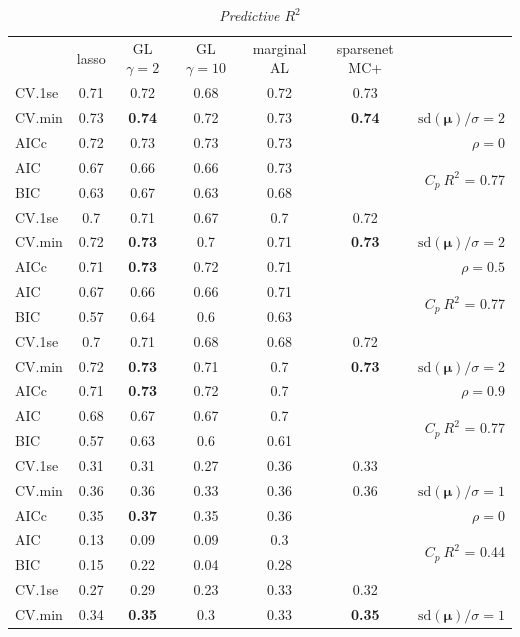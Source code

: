 \documentclass[12pt]{article}
\newcommand{\mr}[1]{\mathrm{#1}}
\newcommand{\bm}[1]{\mathbf{#1}}
\begin{document}
\begin{table}[p]\vspace{-.5cm}
\caption[l]{\it Predictive $R^2$\hfill}
\vspace{-.5cm}
\small{}
\begin{center}
\begin{tabular}{l*{5}{c}|r}
 & lasso & GL $\gamma=2$ & GL $\gamma=10$ & marginal AL & sparsenet MC+  &  \\
\cline{1-7}
CV.1se & 0.71 & 0.72 & 0.68 & 0.72 & 0.73 &\\
CV.min & 0.73 & {\bf 0.74} & 0.72 & 0.73 & {\bf 0.74} &  $\mr{sd}(\bm{\mu})/\sigma=2$ \\
AICc & 0.72 & 0.73 & 0.73 & 0.73 & & $\rho=0$ \\
AIC & 0.67 & 0.66 & 0.66 & 0.73 & & \multirow{2}{*}{$C_p ~ R^2$ = 0.77} \\
BIC & 0.63 & 0.67 & 0.63 & 0.68 & & \\
 \hline 
CV.1se & 0.7 & 0.71 & 0.67 & 0.7 & 0.72 &\\
CV.min & 0.72 & {\bf 0.73} & 0.7 & 0.71 & {\bf 0.73} &  $\mr{sd}(\bm{\mu})/\sigma=2$ \\
AICc & 0.71 & {\bf 0.73} & 0.72 & 0.71 & & $\rho=0.5$ \\
AIC & 0.67 & 0.66 & 0.66 & 0.71 & & \multirow{2}{*}{$C_p ~ R^2$ = 0.77} \\
BIC & 0.57 & 0.64 & 0.6 & 0.63 & & \\
 \hline 
CV.1se & 0.7 & 0.71 & 0.68 & 0.68 & 0.72 &\\
CV.min & 0.72 & {\bf 0.73} & 0.71 & 0.7 & {\bf 0.73} &  $\mr{sd}(\bm{\mu})/\sigma=2$ \\
AICc & 0.71 & {\bf 0.73} & 0.72 & 0.7 & & $\rho=0.9$ \\
AIC & 0.68 & 0.67 & 0.67 & 0.7 & & \multirow{2}{*}{$C_p ~ R^2$ = 0.77} \\
BIC & 0.57 & 0.63 & 0.6 & 0.61 & & \\
 \hline 
CV.1se & 0.31 & 0.31 & 0.27 & 0.36 & 0.33 &\\
CV.min & 0.36 & 0.36 & 0.33 & 0.36 & 0.36 &  $\mr{sd}(\bm{\mu})/\sigma=1$ \\
AICc & 0.35 & {\bf 0.37} & 0.35 & 0.36 & & $\rho=0$ \\
AIC & 0.13 & 0.09 & 0.09 & 0.3 & & \multirow{2}{*}{$C_p ~ R^2$ = 0.44} \\
BIC & 0.15 & 0.22 & 0.04 & 0.28 & & \\
 \hline 
CV.1se & 0.27 & 0.29 & 0.23 & 0.33 & 0.32 &\\
CV.min & 0.34 & {\bf 0.35} & 0.3 & 0.33 & {\bf 0.35} &  $\mr{sd}(\bm{\mu})/\sigma=1$ \\

\end{tabular}
\end{center}
\end{table}
\end{document}
